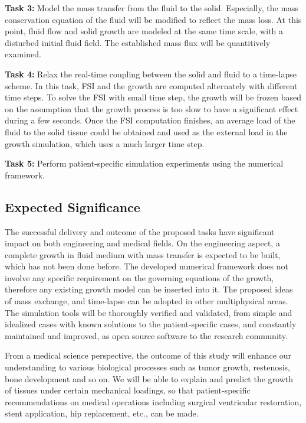 \documentclass[12pt]{article}
\begin{document}
\textbf{Task 3:} Model the mass transfer from the fluid to the solid. Especially, the mass conservation equation of the fluid will be modified to reflect the mass loss. At this point, fluid flow and solid growth are modeled at the same time scale, with a disturbed initial fluid field. The established mass flux will be quantitively examined.

\textbf{Task 4:} Relax the real-time coupling between the solid and fluid to a time-lapse scheme. In this task, FSI and the growth are computed alternately with different time steps. To solve the FSI with small time step, the growth will be frozen based on the assumption that the growth process is too slow to have a significant effect during a few seconds. Once the FSI computation finishes, an average load of the fluid to the solid tissue could be obtained and used as the external load in the growth simulation, which uses a much larger time step.

\textbf{Task 5:} Perform patient-specific simulation experiments using the numerical framework.

\subsection{Expected Significance}
The successful delivery and outcome of the proposed tasks have significant impact on both engineering and medical fields. On the engineering aspect, a complete growth in fluid medium with mass transfer is expected to be built, which has not been done before. The developed numerical framework does not involve any specific requirement on the governing equations of the growth, therefore any existing growth model can be inserted into it. The proposed ideas of mass exchange, and time-lapse can be adopted in other multiphysical areas. The simulation tools will be thoroughly verified and validated, from simple and idealized cases with known solutions to the patient-specific cases, and constantly maintained and improved, as open source software to the research community.

From a medical science perspective, the outcome of this study will enhance our understanding to various biological processes such as tumor growth, restenosis, bone development and so on. We will be able to explain and predict the growth of tissues under certain mechanical loadings, so that patient-specific recommendations on medical operations including surgical ventricular restoration, stent application, hip replacement, etc., can be made.
\end{document}
